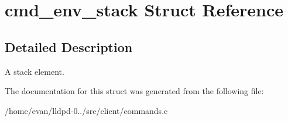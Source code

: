 \section{cmd\-\_\-env\-\_\-stack \-Struct \-Reference}
\label{structcmd__env__stack}


\subsection{\-Detailed \-Description}
\-A stack element. 

\-The documentation for this struct was generated from the following file\-:\begin{DoxyCompactItemize}
\item 
/home/evan/lldpd-\/0../src/client/commands.\-c\end{DoxyCompactItemize}
